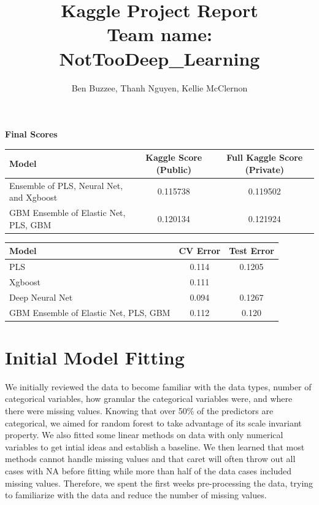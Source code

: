 \documentclass[12pt]{article}
\title{Kaggle Project Report \\ Team name: NotTooDeep\_Learning}
\author{Ben Buzzee, Thanh Nguyen, Kellie McClernon}
\newcommand{\thanh}[1]{#1}
\begin{document}
\maketitle

\textbf{Final Scores}
\begin{center}
\begin{tabular}{l c c}
\hline
Model & Kaggle Score (Public) & Full Kaggle Score (Private) \\
\hline
Ensemble of PLS, Neural Net, and Xgboost & 0.115738 & 0.119502 \\
GBM Ensemble of Elastic Net, PLS, GBM & 0.120134 & 0.121924 \\
\hline
\end{tabular}
\end{center}

\begin{center}
\begin{tabular}{l c c}
\hline
Model & CV Error & Test Error\\
\hline
PLS & 0.114 & 0.1205 \\
Xgboost & 0.111 \\
Deep Neural Net & 0.094 & 0.1267 \\
GBM Ensemble of Elastic Net, PLS, GBM & 0.112 & 0.120\\
\hline
\end{tabular}
\end{center}


\section{Initial Model Fitting}

We initially reviewed the data to become familiar with the data types, number of categorical variables, how granular the categorical variables were, and where there were missing values. \thanh{Knowing that over 50\% of the predictors are categorical, we aimed for random forest to take advantage of its scale invariant property. We also fitted some linear methods on data with only numerical variables to get intial ideas and establish a baseline.}  %
We then learned that most methods cannot handle missing values and that caret will often throw out all cases with NA before fitting while more than half of the data cases included missing values. %
Therefore, we spent the first weeks pre-processing the data, trying to familiarize with the data and reduce the number of missing values.
\end{document}
